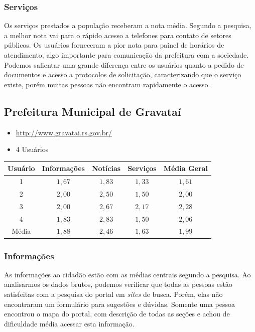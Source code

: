 \documentclass{article}
\begin{document}
\subsubsection{Serviços}

Os serviços prestados a população receberam a nota média. Segundo a pesquisa, a
melhor nota vai para o rápido acesso a telefones para contato de setores
públicos. Os usuários forneceram a pior nota para painel de horários de
atendimento, algo importante para comunicação da prefeitura com a sociedade.
Podemos salientar uma grande diferença entre os usuários quanto a pedido de
documentos e acesso a protocolos de solicitação, caracterizando que o serviço
existe, porém muitas pessoas não encontram rapidamente o acesso.

\subsection{Prefeitura Municipal de Gravataí}

\begin{itemize}
  \item \url{http://www.gravatai.rs.gov.br/}
  \item 4 Usuários
\end{itemize}

\begin{center}
    \begin{tabular}{|c|c|c|c|c|}
        \hline{} Usuário & Informações & Notícias & Serviços & Média Geral\\
        \hline{} 1 & $1,67$ & $1,83$ & $1,33$ & $1,61$\\
        \hline{} 2 & $2,00$ & $2,50$ & $1,50$ & $2,00$\\
        \hline{} 3 & $2,00$ & $2,67$ & $2,17$ & $2,28$\\
        \hline{} 4 & $1,83$ & $2,83$ & $1,50$ & $2,06$\\
        \hline{} Média & $1,88$ & $2,46$ & $1,63$ & $1,99$\\\hline
    \end{tabular}
\end{center}

\subsubsection{Informações}

As informações ao cidadão estão com as médias centrais segundo a pesquisa. Ao
analisarmos os dados brutos, podemos verificar que todas as pessoas estão
satisfeitas com a pesquisa do portal em \textit{sites} de busca. Porém, elas não
encontraram um formulário para sugestões e dúvidas. Somente uma pessoa encontrou
o mapa do portal, com descrição de todas as seções e achou de dificuldade média
acessar esta informação.
\end{document}
